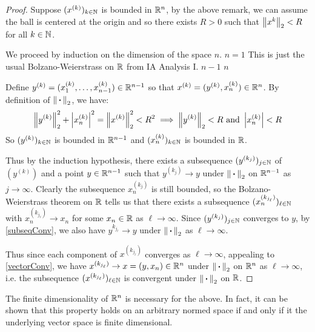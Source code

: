\documentclass[../main.tex]{subfiles}
\begin{document}
\begin{proof}
  Suppose $(x^{(k)})_{k \in \mathbb{N}}$ is bounded in $\mathbb{R}^n$, by the above remark, we can assume the ball is centered at the origin and so there exists $R > 0$ such that $\left\lVert x^{k} \right\rVert_2 < R$ for all $k \in \mathbb{N}$.

  We proceed by induction on the dimension of the space $n$.
  \quietinduction
  {$n = 1$}{
    This is just the usual Bolzano-Weierstrass on $\mathbb{R}$ from IA Analysis I.
  }
  {$n - 1$}{}
  {$n$}{
    Define $y^{(k)} = (x^{(k)}_1, \ldots, x^{(k)}_{n - 1}) \in \mathbb{R}^{n - 1}$ so that $x^{(k)} = (y^{(k)}, x^{(k)}_n) \in \mathbb{R}^{n}$.
    By definition of $\left\lVert {\hspace{0.18em}\boldsymbol{\cdot}\hspace{0.18em}} \right\rVert_2$, we have:
    \[
      \left\lVert y^{(k)} \right\rVert^2_2 + \left\lvert x^{(k)}_n \right\rvert^2 = \left\lVert x^{(k)} \right\rVert^2_2 < R^2 \implies \left\lVert y^{(k)} \right\rVert_2 < R \text{ and } \left\lvert x^{(k)}_n \right\rvert < R
    \]
    So $(y^{(k)})_{k \in \mathbb{N}}$ is bounded in $\mathbb{R}^{n - 1}$ and $(x^{(k)}_n)_{k \in \mathbb{N}}$ is bounded in $\mathbb{R}$.

    Thus by the induction hypothesis, there exists a subsequence $(y^{(k_j)})_{j \in \mathbb{N}}$ of $(y^{(k)})$ and a point $y \in \mathbb{R}^{n - 1}$ such that $y^{(k_j)} \to y$ under $\left\lVert {\hspace{0.18em}\boldsymbol{\cdot}\hspace{0.18em}} \right\rVert_2$ on $\mathbb{R}^{n - 1}$ as $j \to \infty$.
    Clearly the subsequence $x^{(k_j)}_n$ is still bounded, so the Bolzano-Weierstrass theorem on $\mathbb{R}$ tells us that there exists a subsequence $(x^{(k_{j_{\ell}})}_n)_{\ell \in \mathbb{N}}$ with $x^{(k_{j_{\ell}})}_n \to x_n$ for some $x_n \in \mathbb{R}$ as $\ell \to \infty$.
    Since $(y^{(k_j)})_{j \in \mathbb{N}}$ converges to $y$, by \cref{subseqConv}, we also have $y^{k_{j_\ell}} \to y$ under $\left\lVert {\hspace{0.18em}\boldsymbol{\cdot}\hspace{0.18em}} \right\rVert_2$ as $\ell \to \infty$.

    Thus since each component of $x^{(k_{j_\ell})}$ converges as $\ell \to \infty$, appealing to \cref{vectorConv}, we have $x^{(k_{j_{\ell}})} \to x = (y, x_n) \in \mathbb{R}^{n}$ under $\left\lVert {\hspace{0.18em}\boldsymbol{\cdot}\hspace{0.18em}} \right\rVert_2$ on $\mathbb{R}^n$ as $\ell \to \infty$, i.e. the subsequence $(x^{(k_{j_\ell})})_{\ell \in \mathbb{N}}$ is convergent under $\left\lVert {\hspace{0.18em}\boldsymbol{\cdot}\hspace{0.18em}} \right\rVert_2$ on $\mathbb{R}$.
  }
\end{proof}
\begin{remark}
  The finite dimensionality of $\mathbb{R}^n$ is necessary for the above.
  In fact, it can be shown that this property holds on an arbitrary normed space if and only if it the underlying vector space is finite dimensional.
\end{remark}
\end{document}
